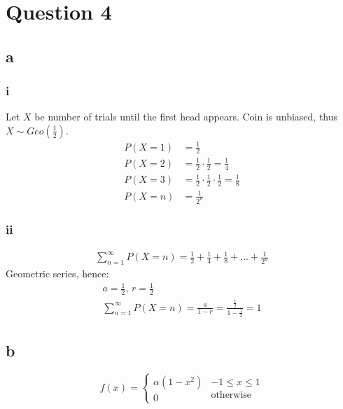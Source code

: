 \documentclass[11pt]{article}
\numberwithin{equation}{section}
\begin{document}
\section{Question 4}
\subsection{a}
\subsubsection{i}
Let $X$ be number of trials until the first head appears. Coin is unbiased, thus $X \sim Geo\left(\frac{1}{2}\right)$.
\begin{align}
    P(X = 1) &= \frac{1}{2}\\
    P(X = 2) &= \frac{1}{2}\cdot\frac{1}{2} = \frac{1}{4}\\
    P(X = 3) &= \frac{1}{2}\cdot\frac{1}{2}\cdot\frac{1}{2} = \frac{1}{8}\\
    P(X = n) &= \frac{1}{2^n}
\end{align}
\subsubsection{ii}
\begin{gather}
    \sum_{n=1}^{\infty} P(X=n) = \frac{1}{2} + \frac{1}{4} + \frac{1}{8} + ... + \frac{1}{2^n}
\end{gather}
Geometric series, hence:
\begin{gather}
    a = \frac{1}{2}, \, r = \frac{1}{2}\\
    \sum_{n=1}^{\infty} P(X=n) = \frac{a}{1-r} = \frac{\frac{1}{2}}{1-\frac{1}{2}} = 1
\end{gather}
\subsection{b}
\begin{equation}
    f(x) = \begin{cases}
        \alpha \left(1 - x^2\right)\\
        0 
    \end{cases} \begin{array}{l}
        -1 \leq x \leq 1\\
        \textrm{otherwise}
    \end{array}
\end{equation}
\end{document}
